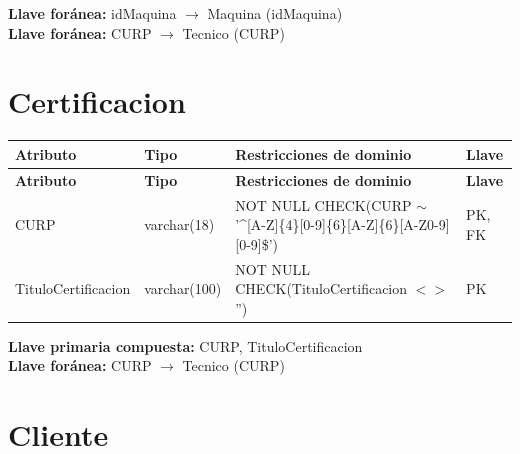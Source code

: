 \documentclass[12pt]{article}
\begin{document}
\vspace{2pt}
\textbf{Llave foránea:} idMaquina $\rightarrow$ Maquina (idMaquina)\\
\textbf{Llave foránea:} CURP $\rightarrow$ Tecnico (CURP)\\


\section*{Certificacion}

\begin{longtable}{p{3.5cm} p{2.5cm} p{7.5cm} p{1.5cm}}
\label{tab:certificacion}\\
\toprule
\textbf{Atributo} & \textbf{Tipo} & \textbf{Restricciones de dominio} & \textbf{Llave} \\
\midrule
\endfirsthead

\toprule
\textbf{Atributo} & \textbf{Tipo} & \textbf{Restricciones de dominio} & \textbf{Llave} \\
\midrule
\endhead
\bottomrule
\endfoot

CURP 
& varchar(18) 
& NOT NULL \newline CHECK(CURP $\sim$ '\^{}[A-Z]\{4\}[0-9]\{6\}[A-Z]\{6\}[A-Z0-9][0-9]\$')
& PK, FK \\

TituloCertificacion 
& varchar(100) 
& NOT NULL \newline CHECK(TituloCertificacion $<>$ '')
& PK \\

\end{longtable}

\vspace{2pt}
\textbf{Llave primaria compuesta:} CURP, TituloCertificacion\\
\textbf{Llave foránea:} CURP $\rightarrow$ Tecnico (CURP)\\



\section*{Cliente}
\end{document}
